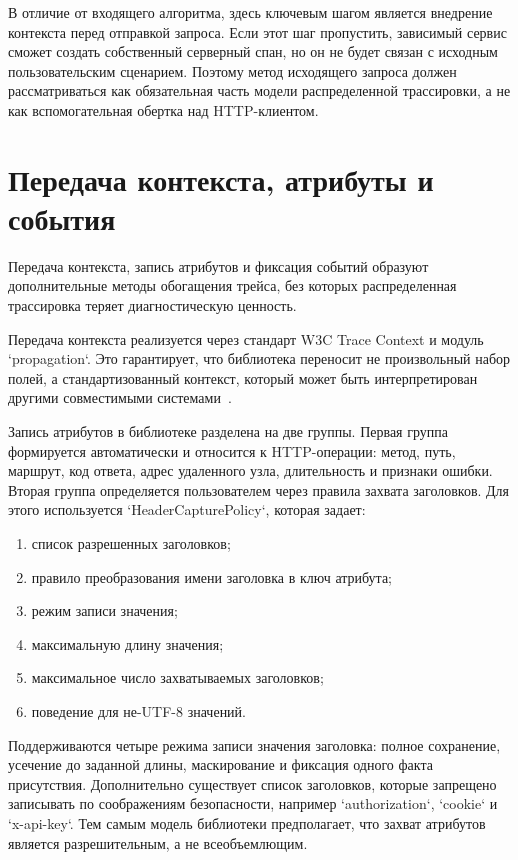 В отличие от входящего алгоритма, здесь ключевым шагом является внедрение
контекста перед отправкой запроса. Если этот шаг пропустить, зависимый сервис
сможет создать собственный серверный спан, но он не будет связан с исходным
пользовательским сценарием. Поэтому метод исходящего запроса должен рассматриваться
как обязательная часть модели распределенной трассировки, а не как вспомогательная
обертка над HTTP-клиентом.

\section{Передача контекста, атрибуты и события}

Передача контекста, запись атрибутов и фиксация событий образуют дополнительные
методы обогащения трейса, без которых распределенная трассировка теряет
диагностическую ценность.

Передача контекста реализуется через стандарт W3C Trace Context и модуль `propagation`.
Это гарантирует, что библиотека переносит не произвольный набор полей, а
стандартизованный контекст, который может быть интерпретирован другими
совместимыми системами~\cite{w3cTraceContext,opentelemetryPropagationDocs}.

Запись атрибутов в библиотеке разделена на две группы. Первая группа формируется
автоматически и относится к HTTP-операции: метод, путь, маршрут, код ответа,
адрес удаленного узла, длительность и признаки ошибки. Вторая группа определяется
пользователем через правила захвата заголовков. Для этого используется
`HeaderCapturePolicy`, которая задает:
\begin{enumerate}
    \item список разрешенных заголовков;
    \item правило преобразования имени заголовка в ключ атрибута;
    \item режим записи значения;
    \item максимальную длину значения;
    \item максимальное число захватываемых заголовков;
    \item поведение для не-UTF-8 значений.
\end{enumerate}

Поддерживаются четыре режима записи значения заголовка: полное сохранение,
усечение до заданной длины, маскирование и фиксация одного факта присутствия.
Дополнительно существует список заголовков, которые запрещено записывать по
соображениям безопасности, например `authorization`, `cookie` и `x-api-key`.
Тем самым модель библиотеки предполагает, что захват атрибутов является
разрешительным, а не всеобъемлющим.

